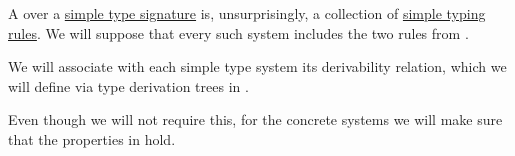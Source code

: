 \begin{definition}\label{def:simple_type_system}\mimprovised
  A  over a \hyperref[def:simple_type_signature]{simple type signature} is, unsurprisingly, a collection of \hyperref[def:simple_typing_rule]{simple typing rules}. We will suppose that every such system includes the two rules from .

  We will associate with each simple type system its derivability relation, which we will define via type derivation trees in .
\end{definition}
\begin{comments}
  \item Even though we will not require this, for the concrete systems we will make sure that the properties in  hold.
\end{comments}

